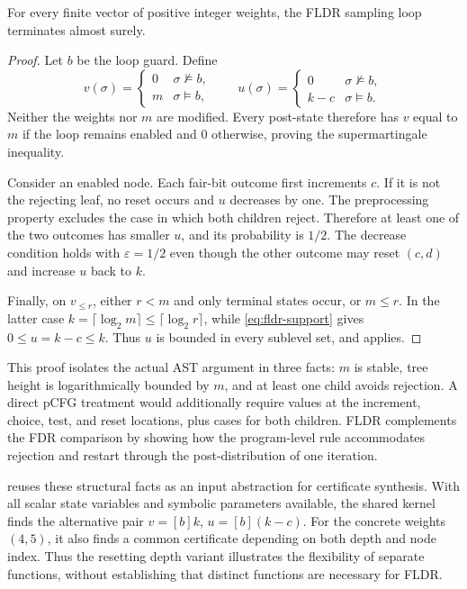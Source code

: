 \begin{theorem}
\label{thm:fldr}
For every finite vector of positive integer weights, the FLDR sampling loop terminates almost surely.
\end{theorem}
\begin{proof}
Let $b$ be the loop guard. Define
\[
 v(\sigma)=\begin{cases}0&\sigma\not\models b,\\m&\sigma\models b,\end{cases}
 \qquad
 u(\sigma)=\begin{cases}0&\sigma\not\models b,\\k-c&\sigma\models b.\end{cases}
\]
Neither the weights nor $m$ are modified. Every post-state therefore has $v$ equal to $m$ if the loop remains enabled and $0$ otherwise, proving the supermartingale inequality.

Consider an enabled node. Each fair-bit outcome first increments $c$. If it is not the rejecting leaf, no reset occurs and $u$ decreases by one. The preprocessing property excludes the case in which both children reject. Therefore at least one of the two outcomes has smaller $u$, and its probability is $1/2$. The decrease condition holds with $\varepsilon=1/2$ even though the other outcome may reset $(c,d)$ and increase $u$ back to $k$.

Finally, on $v_{\le r}$, either $r<m$ and only terminal states occur, or $m\le r$. In the latter case $k=\lceil\log_2m\rceil\le\lceil\log_2r\rceil$, while \eqref{eq:fldr-support} gives $0\le u=k-c\le k$. Thus $u$ is bounded in every sublevel set, and  applies.
\end{proof}

This proof isolates the actual AST argument in three facts: $m$ is stable, tree height is logarithmically bounded by $m$, and at least one child avoids rejection. A direct pCFG treatment would additionally require values at the increment, choice, test, and reset locations, plus cases for both children. FLDR complements the FDR comparison by showing how the program-level rule accommodates rejection and restart through the post-distribution of one iteration.

 reuses these structural facts as an input abstraction for certificate synthesis. With all scalar state variables and symbolic parameters available, the shared kernel finds the alternative pair $v=[b]k$, $u=[b](k-c)$. For the concrete weights $(4,5)$, it also finds a common certificate depending on both depth and node index. Thus the resetting depth variant illustrates the flexibility of separate functions, without establishing that distinct functions are necessary for FLDR.

